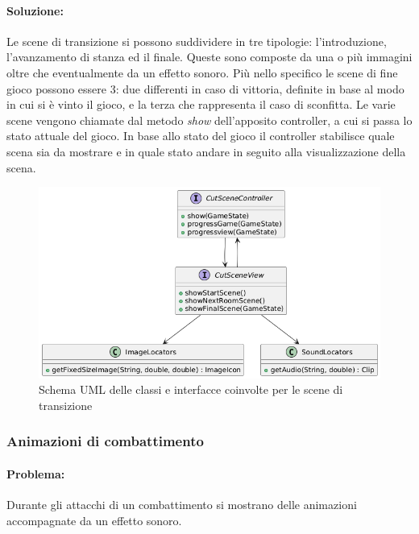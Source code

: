 \documentclass[a4paper,12pt]{report}
\begin{document}
\paragraph{Soluzione:} Le scene di transizione si possono suddividere in tre tipologie: l'introduzione, l'avanzamento di stanza ed il finale. Queste sono composte da una o più
immagini oltre che eventualmente da un effetto sonoro. Più nello specifico le scene di fine gioco possono essere 3: due differenti in caso di vittoria, definite in base al modo in cui 
si è vinto il gioco, e la terza che rappresenta il caso di sconfitta.
Le varie scene vengono chiamate dal metodo \textit{show} dell'apposito controller, a cui si passa lo stato attuale del gioco. In base allo stato del gioco il controller stabilisce
quale scena sia da mostrare e in quale stato andare in seguito alla visualizzazione della scena. 
\begin{figure}[H]
	\centering{}
	\includegraphics[width=\textwidth]{img/lorenzo/cutscene.png}
	\caption{Schema UML delle classi e interfacce coinvolte per le scene di transizione}
	\label{img:template}
\end{figure}

\subsubsection{Animazioni di combattimento}
\paragraph{Problema:} Durante gli attacchi di un combattimento si mostrano delle animazioni accompagnate da un effetto sonoro.
\end{document}
